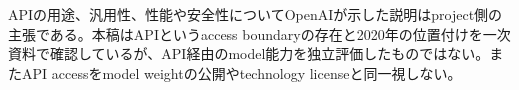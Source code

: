\begin{claimboundary}
APIの用途、汎用性、性能や安全性についてOpenAIが示した説明はproject側の主張である。本稿はAPIというaccess boundaryの存在と2020年の位置付けを一次資料で確認しているが、API経由のmodel能力を独立評価したものではない。またAPI accessをmodel weightの公開やtechnology licenseと同一視しない。\autocite{src-3b6a4c260e20}
\end{claimboundary}
